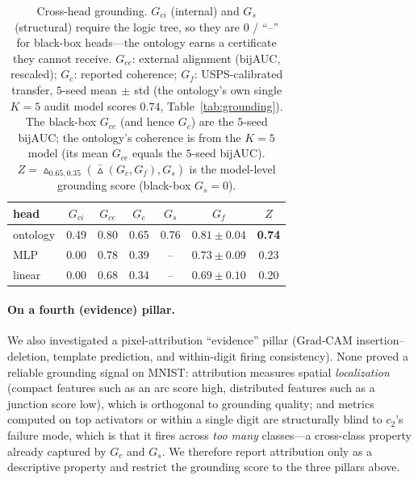 \begin{table}[t]
\centering
\caption{Cross-head grounding. $G_{ci}$ (internal) and $G_s$ (structural) require the
logic tree, so they are $0$ / ``--'' for black-box heads---the ontology earns a
certificate they cannot receive. $G_{ce}$: external alignment (bijAUC, rescaled);
$G_c$: reported coherence; $G_f$: USPS-calibrated transfer, $5$-seed mean$\,\pm\,$std
(the ontology's own single $K{=}5$ audit model scores $0.74$, Table~\ref{tab:grounding}).
The black-box $G_{ce}$ (and hence $G_c$) are the $5$-seed bijAUC; the ontology's
coherence is from the $K{=}5$ model (its mean $G_{ce}$ equals the $5$-seed bijAUC).
$Z=\vartriangle_{\!0.65,0.35}(\bar\vartriangle(G_c,G_f),G_s)$ is the model-level
grounding score (black-box $G_s{=}0$).}
\label{tab:heads}
\small
\begin{tabular}{lcccccc}
\toprule
head & $G_{ci}$ & $G_{ce}$ & $G_c$ & $G_s$ & $G_f$ & $Z$ \\
\midrule
ontology & 0.49 & 0.80 & 0.65 & 0.76 & $0.81{\pm}0.04$ & \textbf{0.74} \\
MLP      & 0.00 & 0.78 & 0.39 & --   & $0.73{\pm}0.09$ & 0.23 \\
linear   & 0.00 & 0.68 & 0.34 & --   & $0.69{\pm}0.10$ & 0.20 \\
\bottomrule
\end{tabular}
\end{table}

\paragraph{On a fourth (evidence) pillar.}
We also investigated a pixel-attribution ``evidence'' pillar (Grad-CAM
insertion--deletion, template prediction, and within-digit firing consistency).
None proved a reliable grounding signal on MNIST: attribution measures spatial
\emph{localization} (compact features such as an arc score high, distributed
features such as a junction score low), which is orthogonal to grounding quality;
and metrics computed on top activators or within a single digit are structurally
blind to $c_2$'s failure mode, which is that it fires across \emph{too many}
classes---a cross-class property already captured by $G_c$ and $G_s$. We therefore
report attribution only as a descriptive property and restrict the grounding score
to the three pillars above.
